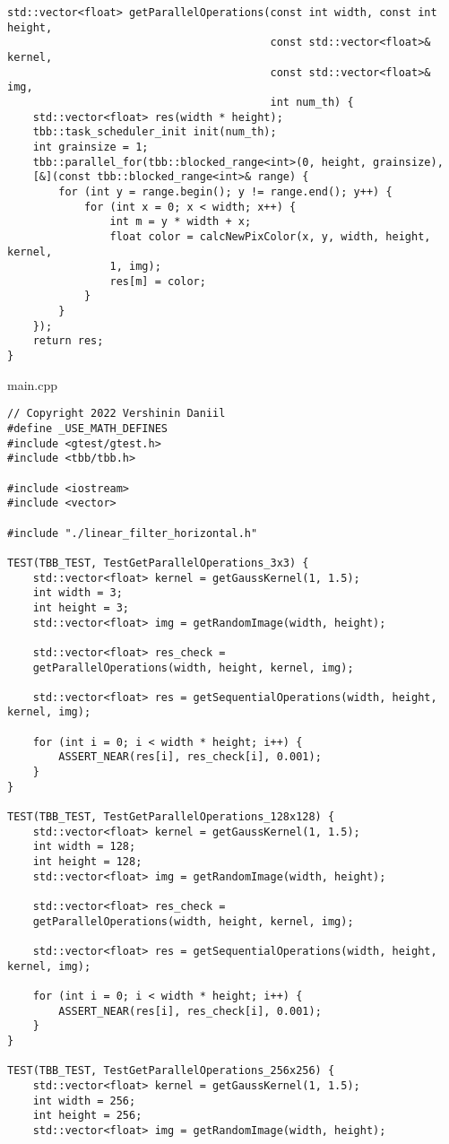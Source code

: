 \documentclass{report}
\begin{document}
\begin{lstlisting}
std::vector<float> getParallelOperations(const int width, const int height,
                                         const std::vector<float>& kernel,
                                         const std::vector<float>& img,
                                         int num_th) {
	std::vector<float> res(width * height);
	tbb::task_scheduler_init init(num_th);
	int grainsize = 1;
	tbb::parallel_for(tbb::blocked_range<int>(0, height, grainsize),
	[&](const tbb::blocked_range<int>& range) {
		for (int y = range.begin(); y != range.end(); y++) {
			for (int x = 0; x < width; x++) {
				int m = y * width + x;
				float color = calcNewPixColor(x, y, width, height, kernel,
				1, img);
				res[m] = color;
			}
		}
	});
	return res;
}
\end{lstlisting}
main.cpp
\begin{lstlisting}
// Copyright 2022 Vershinin Daniil
#define _USE_MATH_DEFINES
#include <gtest/gtest.h>
#include <tbb/tbb.h>

#include <iostream>
#include <vector>

#include "./linear_filter_horizontal.h"

TEST(TBB_TEST, TestGetParallelOperations_3x3) {
	std::vector<float> kernel = getGaussKernel(1, 1.5);
	int width = 3;
	int height = 3;
	std::vector<float> img = getRandomImage(width, height);
	
	std::vector<float> res_check =
	getParallelOperations(width, height, kernel, img);
	
	std::vector<float> res = getSequentialOperations(width, height, kernel, img);
	
	for (int i = 0; i < width * height; i++) {
		ASSERT_NEAR(res[i], res_check[i], 0.001);
	}
}

TEST(TBB_TEST, TestGetParallelOperations_128x128) {
	std::vector<float> kernel = getGaussKernel(1, 1.5);
	int width = 128;
	int height = 128;
	std::vector<float> img = getRandomImage(width, height);
	
	std::vector<float> res_check =
	getParallelOperations(width, height, kernel, img);
	
	std::vector<float> res = getSequentialOperations(width, height, kernel, img);
	
	for (int i = 0; i < width * height; i++) {
		ASSERT_NEAR(res[i], res_check[i], 0.001);
	}
}

TEST(TBB_TEST, TestGetParallelOperations_256x256) {
	std::vector<float> kernel = getGaussKernel(1, 1.5);
	int width = 256;
	int height = 256;
	std::vector<float> img = getRandomImage(width, height);
	

\end{lstlisting}
\end{document}

